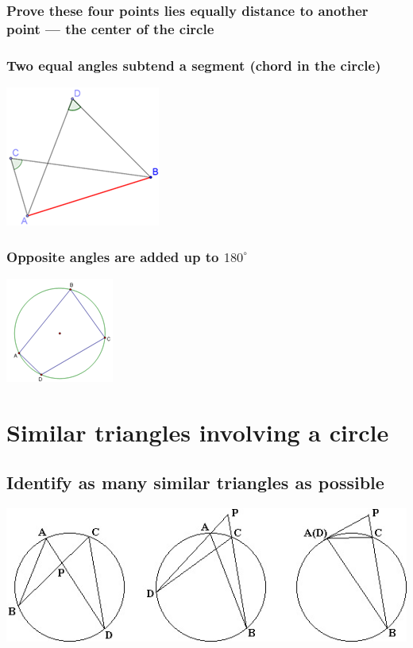 \documentclass{article}
\begin{document}
\subsubsection{Prove these four points lies equally distance to another point — the center of the circle}

\subsubsection{Two equal angles subtend a segment (chord in the circle)}

\includegraphics{Picture10.png}

\subsubsection{Opposite angles are added up to \(180^{\circ}\)}

\includegraphics{Picture11.png}

\pagebreak

\section{Similar triangles involving a circle}

\subsection{Identify as many similar triangles as possible}

\includegraphics[scale=.75]{Picture12.jpg}
\end{document}
